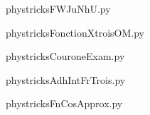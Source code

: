     

    \clearpage
    


    \newcommand{\CaptionFigFWJuNhU}{<+Type your caption here+>}
    \begin{center}
        
    \end{center}
    phystricksFWJuNhU.py

    

    \clearpage
    


    \newcommand{\CaptionFigFonctionXtroisOM}{<+Type your caption here+>}
    \begin{center}
        
    \end{center}
    phystricksFonctionXtroisOM.py

    

    \clearpage
    


    \newcommand{\CaptionFigCouroneExam}{<+Type your caption here+>}
    \begin{center}
        
    \end{center}
    phystricksCouroneExam.py

    

    \clearpage
    


    \newcommand{\CaptionFigAdhIntFrTrois}{<+Type your caption here+>}
    \begin{center}
        
    \end{center}
    phystricksAdhIntFrTrois.py

    

    \clearpage
    


    \newcommand{\CaptionFigFnCosApprox}{<+Type your caption here+>}
    \begin{center}
        
    \end{center}
    phystricksFnCosApprox.py

    

    \clearpage
    


